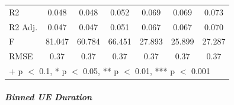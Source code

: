\documentclass[
]{article}
\begin{document}
\begin{table}
{\begin{tabular}[t]{lcccccc}
R2 & \num{0.048} & \num{0.048} & \num{0.052} & \num{0.069} & \num{0.069} & \num{0.073}\\
R2 Adj. & \num{0.047} & \num{0.047} & \num{0.051} & \num{0.067} & \num{0.067} & \num{0.070}\\
F & \num{81.047} & \num{60.784} & \num{66.451} & \num{27.893} & \num{25.899} & \num{27.287}\\
RMSE & \num{0.37} & \num{0.37} & \num{0.37} & \num{0.37} & \num{0.37} & \num{0.37}\\
\bottomrule
\multicolumn{7}{l}{\rule{0pt}{1em}+ p $<$ 0.1, * p $<$ 0.05, ** p $<$ 0.01, *** p $<$ 0.001}\\
\end{tabular}}
\end{table}

\FloatBarrier

\subparagraph{Binned UE Duration}\label{binned-ue-duration}
\end{document}
